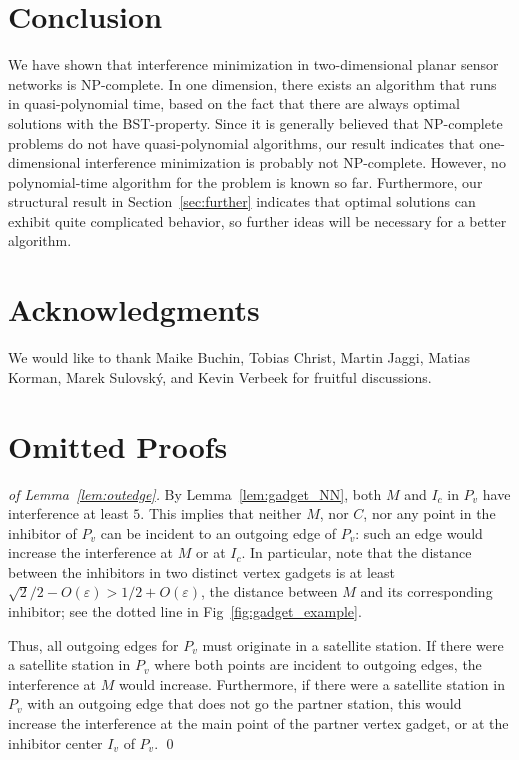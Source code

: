 \documentclass[envcountsect,envcountsame,runningheads,a4paper]{llncs}
\newcommand{\eps}{\varepsilon}
\begin{document}
\section{Conclusion}

We have shown that interference minimization in two-dimensional planar sensor
networks is NP-complete. In one dimension, there exists an algorithm
that runs in quasi-polynomial time, based on the fact that there are always
optimal solutions with the BST-property. Since it is generally believed that
NP-complete problems do not have quasi-polynomial algorithms, our result indicates
that one-dimensional interference minimization is probably not NP-complete. However,
no polynomial-time algorithm for the problem is known so far. Furthermore,
our structural result in Section~\ref{sec:further} indicates that optimal solutions
can exhibit quite complicated behavior, so further ideas will be necessary for a
better algorithm.


\section*{Acknowledgments}
We would like to thank Maike Buchin, Tobias Christ, Martin Jaggi, Matias Korman, Marek Sulovsk\'y,
and Kevin Verbeek for fruitful discussions.




\newpage
\appendix
\section{Omitted Proofs}\label{sec:omitted}

\begin{proof}[of Lemma~\ref{lem:outedge}]
By Lemma~\ref{lem:gadget_NN}, both
$M$ and $I_c$ in $P_v$ have interference
at least $5$.
This implies that neither $M$, nor $C$, nor
any point in the inhibitor of $P_v$ can be
incident to an outgoing edge of $P_v$:
such an edge would increase the interference at
$M$ or at $I_c$.
In particular, note that the
distance between the inhibitors in
two distinct vertex gadgets is at least
$\sqrt{2}/2 - O(\eps) > 1/2 +O(\eps)$,
the distance between $M$
and its corresponding inhibitor; see the
dotted line in Fig~\ref{fig:gadget_example}.

Thus, all outgoing edges for $P_v$ must originate in
a satellite station.
If there were a satellite station in $P_v$ where
both points are incident to outgoing edges,
the interference at $M$ would increase.
Furthermore, if there were a satellite station in $P_v$ with
an outgoing edge that does not go the partner station,
this would increase the interference at the main point
of the partner vertex gadget, or at the inhibitor center $I_v$ of $P_v$.
\qed{}
\end{proof}
\end{document}
